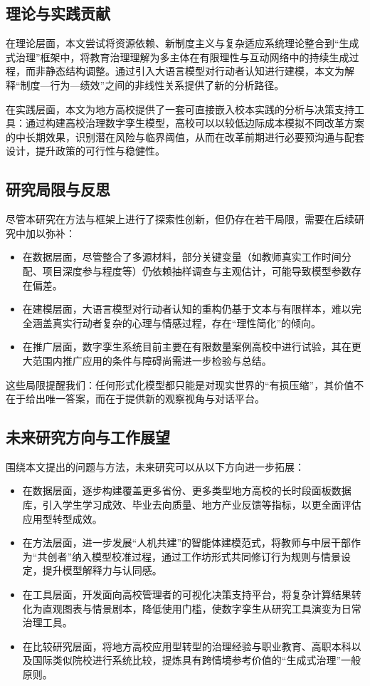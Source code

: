 \documentclass[UTF8, zihao=-4, fontset=mac]{ctexart}
\begin{document}
\subsection{理论与实践贡献}

在理论层面，本文尝试将资源依赖、新制度主义与复杂适应系统理论整合到“生成式治理”框架中，将教育治理理解为多主体在有限理性与互动网络中的持续生成过程，而非静态结构调整。通过引入大语言模型对行动者认知进行建模，本文为解释“制度—行为—绩效”之间的非线性关系提供了新的分析路径。

在实践层面，本文为地方高校提供了一套可直接嵌入校本实践的分析与决策支持工具：通过构建高校治理数字孪生模型，高校可以以较低边际成本模拟不同改革方案的中长期效果，识别潜在风险与临界阈值，从而在改革前期进行必要预沟通与配套设计，提升政策的可行性与稳健性。

\subsection{研究局限与反思}

尽管本研究在方法与框架上进行了探索性创新，但仍存在若干局限，需要在后续研究中加以弥补：

\begin{itemize}
    \item 在数据层面，尽管整合了多源材料，部分关键变量（如教师真实工作时间分配、项目深度参与程度等）仍依赖抽样调查与主观估计，可能导致模型参数存在偏差。
    \item 在建模层面，大语言模型对行动者认知的重构仍基于文本与有限样本，难以完全涵盖真实行动者复杂的心理与情感过程，存在“理性简化”的倾向。
    \item 在推广层面，数字孪生系统目前主要在有限数量案例高校中进行试验，其在更大范围内推广应用的条件与障碍尚需进一步检验与总结。
\end{itemize}

这些局限提醒我们：任何形式化模型都只能是对现实世界的“有损压缩”，其价值不在于给出唯一答案，而在于提供新的观察视角与对话平台。

\subsection{未来研究方向与工作展望}

围绕本文提出的问题与方法，未来研究可以从以下方向进一步拓展：

\begin{itemize}
    \item 在数据层面，逐步构建覆盖更多省份、更多类型地方高校的长时段面板数据库，引入学生学习成效、毕业去向质量、地方产业反馈等指标，以更全面评估应用型转型成效。
    \item 在方法层面，进一步发展“人机共建”的智能体建模范式，将教师与中层干部作为“共创者”纳入模型校准过程，通过工作坊形式共同修订行为规则与情景设定，提升模型解释力与认同感。
    \item 在工具层面，开发面向高校管理者的可视化决策支持平台，将复杂计算结果转化为直观图表与情景剧本，降低使用门槛，使数字孪生从研究工具演变为日常治理工具。
    \item 在比较研究层面，将地方高校应用型转型的治理经验与职业教育、高职本科以及国际类似院校进行系统比较，提炼具有跨情境参考价值的“生成式治理”一般原则。
\end{itemize}
\end{document}
